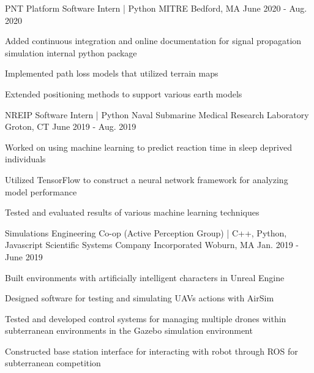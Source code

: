 
\begin{cventries}
  \cventry
    {PNT Platform Software Intern | Python} %
    {MITRE} %
    {Bedford, MA} %
    {June 2020 - Aug. 2020} %
    {
      \begin{cvitems} %
        \item {Added continuous integration and online documentation for signal propagation simulation internal python package}
        \item {Implemented path loss models that utilized terrain maps}
        \item {Extended positioning methods to support various earth models}
      \end{cvitems}
    }
  \cventry
    {NREIP Software Intern | Python} %
    {Naval Submarine Medical Research Laboratory} %
    {Groton, CT} %
    {June 2019 - Aug. 2019} %
    {
      \begin{cvitems} %
        \item {Worked on using machine learning to predict reaction time in sleep deprived individuals}
        \item {Utilized TensorFlow to construct a neural network framework for analyzing model performance}
        \item {Tested and evaluated results of various machine learning techniques}
      \end{cvitems}
    }

  \cventry
    {Simulations Engineering Co-op (Active Perception Group) | C++, Python, Javascript} %
    {Scientific Systems Company Incorporated} %
    {Woburn, MA} %
    {Jan. 2019 - June 2019} %
    {
      \begin{cvitems} %
        \item {Built environments with artificially intelligent characters in Unreal Engine}
        \item {Designed software for testing and simulating UAVs actions with AirSim}
        \item {Tested and developed control systems for managing multiple drones within subterranean environments in 
               the Gazebo simulation environment}
        \item {Constructed base station interface for interacting with robot through ROS for subterranean competition}
      \end{cvitems}
    }


\end{cventries}
